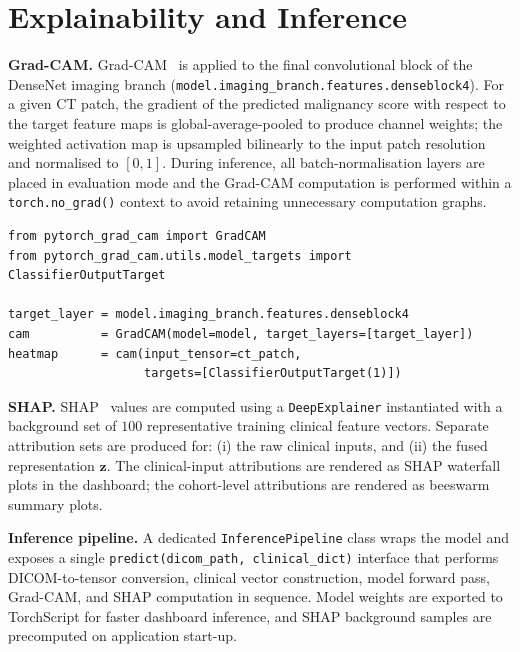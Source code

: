 \section{Explainability and Inference}
\label{sec:appB-xai}

\textbf{Grad-CAM.} Grad-CAM~\cite{selvaraju2017grad} is applied to the final
convolutional block of the DenseNet imaging branch
(\texttt{model.imaging\_branch.features.denseblock4}). For a given CT patch,
the gradient of the predicted malignancy score with respect to the target
feature maps is global-average-pooled to produce channel weights; the
weighted activation map is upsampled bilinearly to the input patch resolution
and normalised to $[0, 1]$. During inference, all batch-normalisation layers
are placed in evaluation mode and the Grad-CAM computation is performed
within a \texttt{torch.no\_grad()} context to avoid retaining unnecessary
computation graphs.

\begin{verbatim}
from pytorch_grad_cam import GradCAM
from pytorch_grad_cam.utils.model_targets import ClassifierOutputTarget

target_layer = model.imaging_branch.features.denseblock4
cam          = GradCAM(model=model, target_layers=[target_layer])
heatmap      = cam(input_tensor=ct_patch,
                   targets=[ClassifierOutputTarget(1)])
\end{verbatim}

\textbf{SHAP.} SHAP~\cite{lundberg2017unified} values are computed using a
\texttt{DeepExplainer} instantiated with a background set of $100$
representative training clinical feature vectors. Separate attribution sets
are produced for: (i) the raw clinical inputs, and (ii) the fused
representation $\mathbf{z}$. The clinical-input attributions are rendered as
SHAP waterfall plots in the dashboard; the cohort-level attributions are
rendered as beeswarm summary plots.

\textbf{Inference pipeline.} A dedicated \texttt{InferencePipeline} class
wraps the model and exposes a single
\texttt{predict(dicom\_path, clinical\_dict)} interface that performs
DICOM-to-tensor conversion, clinical vector construction, model forward pass,
Grad-CAM, and SHAP computation in sequence. Model weights are exported to
TorchScript for faster dashboard inference, and SHAP background samples are
precomputed on application start-up.

